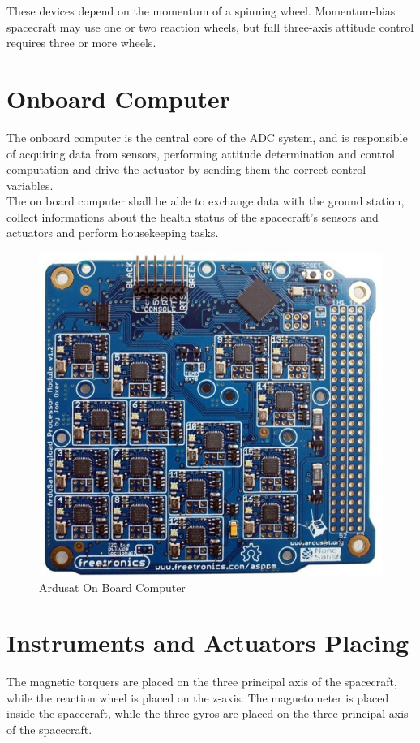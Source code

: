 \documentclass[11pt,a4paper]{report}
\begin{document}
These devices depend on the momentum of a spinning wheel.
Momentum-bias spacecraft may use one or two reaction wheels, but
full three-axis attitude control requires three or more wheels.

\section{Onboard Computer}
The onboard computer is the central core of the ADC system, and is responsible of acquiring data from sensors, performing attitude determination and control computation and drive the actuator by sending them the correct control variables.\\
The on board computer shall be able to exchange data with the ground station, collect informations about the health status of the spacecraft's sensors and actuators and perform housekeeping tasks.

\begin{figure}[H]
 	\centering
 	\includegraphics[scale=0.25]{gfx/ardusat.jpg}
    \caption{Ardusat On Board Computer}
\end{figure}

\section{Instruments and Actuators Placing}
The magnetic torquers are placed on the three principal axis of the spacecraft, while the reaction wheel is placed on the z-axis. The magnetometer is placed inside the spacecraft, while the three gyros are placed on the three principal axis of the spacecraft.
\end{document}
